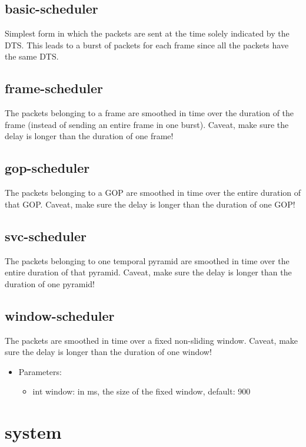 \subsection{basic-scheduler}
Simplest form in which the packets are sent at the time solely indicated by the DTS. This leads to a burst of packets for each frame since all the packets have the same DTS.
\subsection{frame-scheduler}
The packets belonging to a frame are smoothed in time over the duration of the frame (instead of sending an entire frame in one burst). Caveat, make sure the delay is longer than the duration of one frame!
\subsection{gop-scheduler}
The packets belonging to a GOP are smoothed in time over the entire duration of that GOP. Caveat, make sure the delay is longer than the duration of one GOP!
\subsection{svc-scheduler}
The packets belonging to one temporal pyramid are smoothed in time over the entire duration of that pyramid. Caveat, make sure the delay is longer than the duration of one pyramid!
\subsection{window-scheduler}
The packets are smoothed in time over a fixed non-sliding window. Caveat, make sure the delay is longer than the duration of one window!
\begin{itemize}
\item Parameters:
\begin{itemize}
\item int window: in ms, the size of the fixed window, default: 900
\end{itemize}
\end{itemize}
\newpage
\section{system}


